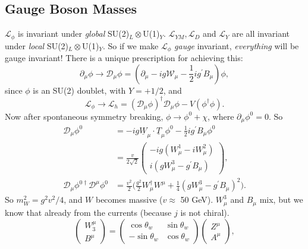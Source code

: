 \documentclass[a4paper,12pt]{article}
\begin{document}
\subsection{Gauge Boson Masses}
%
$\mathcal{L}_\phi$ is invariant under \textit{global} SU(2)$_L \otimes$U(1)$_Y$. $\mathcal{L}_{YM}, \mathcal{L}_D$ and $\mathcal{L}_{Y}$ are all invariant under \textit{local} SU(2)$_L \otimes$U(1)$_Y$. So if we make $\mathcal{L}_\phi$ \textit{gauge} invariant, \textit{everything} will be gauge invariant! There is a unique prescription for achieving this:
\begin{equation}
\partial_\mu \phi \to \mathcal{D}_\mu \phi = (\partial_\mu - ig \mathcal{W}_\mu - \frac{1}{2} ig^\prime B_\mu) \phi,
\end{equation}
since $\phi$ is an SU(2) doublet, with $Y = +1/2$, and
\begin{equation}
\mathcal{L}_\phi \to \mathcal{L}_h = (\mathcal{D}_\mu \phi)^\dagger \mathcal{D}_\mu \phi - V(\phi^\dagger \phi).
\end{equation}
Now after spontaneous symmetry breaking, $\phi \to \phi^0 + \chi$, where $\partial_\mu \phi^0 = 0$. So
\begin{equation}
\begin{split}
\mathcal{D}_\mu \phi^0 &= -ig \underline{W}_\mu \cdot \underline{T}_\mu \phi^0 - \frac{1}{2} i g^\prime B_\mu \phi^0 \\
&= \frac{v}{2\sqrt{2}} 
\begin{pmatrix}  
-ig(W_\mu^1 - i W_\mu^2) \\
i(gW_\mu^3 - g^\prime B_\mu)
\end{pmatrix}, \\
\mathcal{D}_\mu \phi^{0 \dagger} \mathcal{D}^\mu \phi^0 &= \frac{v^2}{2} \bigg(\frac{g^2}{2} W_\mu^\dagger W^\mu + \frac{1}{4}(g W_\mu^3 - g^\prime B_\mu)^2 \bigg).
\end{split}
\end{equation}
So $m_W^2 = g^2v^2/4$, and $W$ becomes massive ($v \approx$ 50 GeV). $W_\mu^3$ and $B_\mu$ mix, but we know that already from the currents (because $j$ is not chiral).  
\[\left( \begin{array}{cc}
W^\mu_3 \\
B^\mu 
\end{array} \right) =
 \left( \begin{array}{cc}
\cos\theta_w & \sin\theta_w  \\
-\sin\theta_w & \cos\theta_w  \end{array} \right) 
\left( \begin{array}{cc}
Z^\mu \\
A^\mu 
\end{array} \right), \]
\end{document}
